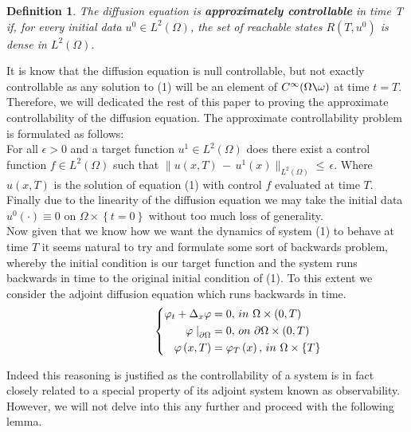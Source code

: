\documentclass[11pt]{article}
\newcommand\tab[1][1cm]{\hspace*{#1}}
\newtheorem{definition}{Definition}
\begin{document}
\begin{definition}
The diffusion equation is \textbf{approximately controllable} in time T if, for every initial data $u^0\in L^2(\Omega)$, the set of reachable states $R(T,u^0)$ is dense in $L^2(\Omega)$.
\end{definition}

It is know that the diffusion equation is null controllable, but not exactly controllable as any solution to (1) will be an element of $C^\infty(\Omega \texttt{\char`\\}\omega)$ at time $t=T$. Therefore, we will dedicated the rest of this paper to proving the approximate controllability of the diffusion equation. The approximate controllability  problem is formulated as follows:\\ 

For all $\epsilon>0$ and a target function $u^1 \in L^2(\Omega)$ does there exist a control function $f \in L^2(\Omega)$ such that $\lVert u(x,T)\,-\,u^1(x)\rVert_{L^2(\Omega)}\leq\,\epsilon$. Where $u(x,T)$ is the solution of equation (1) with control $f$ evaluated at time $T$.\\

Finally due to the linearity of the diffusion equation we may take the initial data $u^0(\cdot)\equiv 0$ on $\Omega\times\left\{t=0\right\}$ without too much loss of generality.\\

Now given that we know how we want the dynamics of system (1) to behave at time $T$ it seems natural to try and formulate some sort of backwards problem, whereby the initial condition is our target function and the system runs backwards in time to the original initial condition of (1). To this extent we consider the adjoint diffusion equation which runs backwards in time.
\begin{equation}
\tab\tab \left\{\begin{aligned}
        \varphi_t+\Delta_x\varphi &= 0,\, in\,\, \Omega\times\left(0,T\right)\\
        \varphi\left.\right\vert_{\partial\Omega} &= 0,\, on\,\, \partial\Omega\times\left(0,T\right)\\
        \varphi\left(x,T\right) &=\varphi_T\left(x\right), \, in\,\, \Omega\times\left\{T\right\}
       \end{aligned}
 \right.
\end{equation}

Indeed this reasoning is justified as the controllability of a system is in fact closely related to a special property of its adjoint system known as observability. However, we will not delve into this any further and proceed with the following lemma.  
\end{document}

